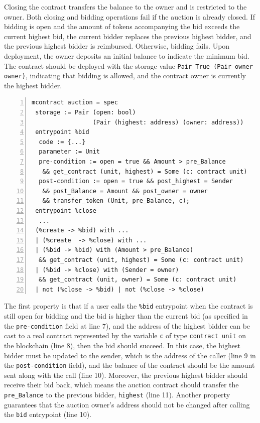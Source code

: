\documentclass[runningheads]{llncs}
\begin{document}
Closing the contract transfers the balance to the owner and is restricted to the owner. Both closing and bidding operations fail if the auction is already closed. If bidding is open and the amount of tokens accompanying the bid exceeds the current highest bid, the current bidder replaces the previous highest bidder, and the previous highest bidder is reimbursed. Otherwise, bidding fails. Upon deployment, the owner deposits an initial balance to indicate the minimum bid. The contract should be deployed with the storage value \lstinline|Pair True (Pair owner owner)|, indicating that bidding is allowed, and the contract owner is currently the highest bidder.

\begin{lstlisting}[float=tp,captionpos=b,caption={Auction contract specification},label={lst:auction-contract-specification},numbers=left]
mcontract auction = spec 
 storage := Pair (open: bool) 
                 (Pair (highest: address) (owner: address))
 entrypoint %bid
  code := {...}
  parameter := Unit 
  pre-condition := open = true && Amount > pre_Balance
   && get_contract (unit, highest) = Some (c: contract unit)
  post-condition := open = true && post_highest = Sender 
   && post_Balance = Amount && post_owner = owner 
   && transfer_token (Unit, pre_Balance, c);
 entrypoint %close
  ...
 (%create -> %bid) with ...
 | (%create  -> %close) with ...
 | (%bid -> %bid) with (Amount > pre_Balance) 
  && get_contract (unit, highest) = Some (c: contract unit)
 | (%bid -> %close) with (Sender = owner) 
  && get_contract (unit, owner) = Some (c: contract unit)
 | not (%close -> %bid) | not (%close -> %close)
\end{lstlisting}

The first property is that if a user calls the \lstinline|%bid| entrypoint when the contract is still open for bidding and the bid is higher than the current bid (as specified in the \lstinline|pre-condition| field at line 7), and the address of the highest bidder can be cast to a real contract represented by the variable \lstinline|c| of type \lstinline|contract unit| on the blockchain (line 8), then the bid should succeed. In this case, the highest bidder must be updated to the sender, which is the address of the caller (line 9 in the \lstinline|post-condition| field), and the balance of the contract should be the amount sent along with the call (line 10). Moreover, the previous highest bidder should receive their bid back, which means the auction contract should transfer the \lstinline|pre_Balance| to the previous bidder, \lstinline|highest| (line 11). Another property guarantees that the auction owner's address should not be changed after calling the \lstinline/bid/ entrypoint (line 10). 
\end{document}
